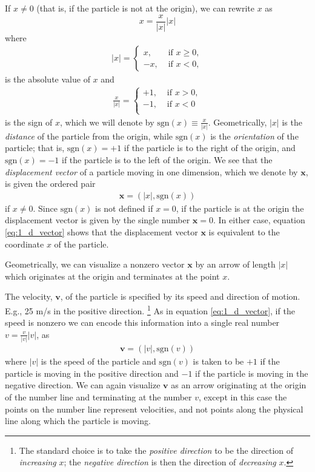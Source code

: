 \documentclass[12pt,letterpaper,reqno]{article}
\numberwithin{equation}{section}
\newcommand{\sgn}{\text{sgn}}
\newcommand{\fixme}[1]{{\color{orange}{[#1]}}}
\begin{document}
If $x \neq 0$ (that is, if the particle is not at the origin), we can rewrite $x$ as 
\begin{equation}\label{eq:1_d_vector}
	x=\frac{x}{|x|}|x|
\end{equation}
where 
\begin{align*}
	|x|=\begin{cases}
		x, &\text{ if } x \geq 0, \\
		-x, &\text{ if } x<0,
	\end{cases}
\end{align*}
is the absolute value of $x$ and 
\begin{align*}
	\frac{x}{|x|}=\begin{cases}
		+1, &\text{ if } x>0, \\
		-1, &\text{ if } x<0 \\
	\end{cases}
\end{align*}
is the sign of $x$, which we will denote by $\sgn(x)\equiv \frac{x}{|x|}$. Geometrically, $|x|$ is the \emph{distance} of the particle from the origin, while $\sgn(x)$ is the \emph{orientation} of the particle; that is, $\sgn(x)=+1$ if the particle is to the right of the origin, and $\sgn(x)=-1$ if the particle is to the left of the origin. We see that the \emph{displacement vector} of a particle moving in one dimension, which we denote by $\mathbf{x}$, is given the ordered pair 
\begin{align*}
	\mathbf{x}=(|x|,\sgn(x))
\end{align*}
if $x \neq 0$. Since $\sgn(x)$ is not defined if $x=0$, if the particle is at the origin the displacement vector is given by the single number $\mathbf{x}=0$. In either case, equation \eqref{eq:1_d_vector} shows that the displacement vector $\mathbf{x}$ is equivalent to the coordinate $x$ of the particle.

Geometrically, we can visualize a nonzero vector $\mathbf{x}$ by an arrow of length $|x|$ which originates at the origin and terminates at the point $x$. \fixme{Insert graphic.}

The velocity, $\mathbf{v}$, of the particle is specified by its speed and direction of motion. E.g., 25 m/s in the positive direction. \footnote{The standard choice is to take the \emph{positive direction} to be the direction of \emph{increasing} $x$; the \emph{negative direction} is then the direction of \emph{decreasing} $x$.} As in equation \eqref{eq:1_d_vector}, if the speed is nonzero we can encode this information into a single real number $v=\frac{v}{|v|}|v|$, as 
\begin{align*}
	\mathbf{v}=(|v|,\sgn(v))
\end{align*}
where $|v|$ is the speed of the particle and $\sgn(v)$ is taken to be $+1$ if the particle is moving in the positive direction and $-1$ if the particle is moving in the negative direction. We can again visualize $\mathbf{v}$ as an arrow originating at the origin of the number line and terminating at the number $v$, except in this case the points on the number line represent velocities, and not points along the physical line along which the particle is moving.
\end{document}
